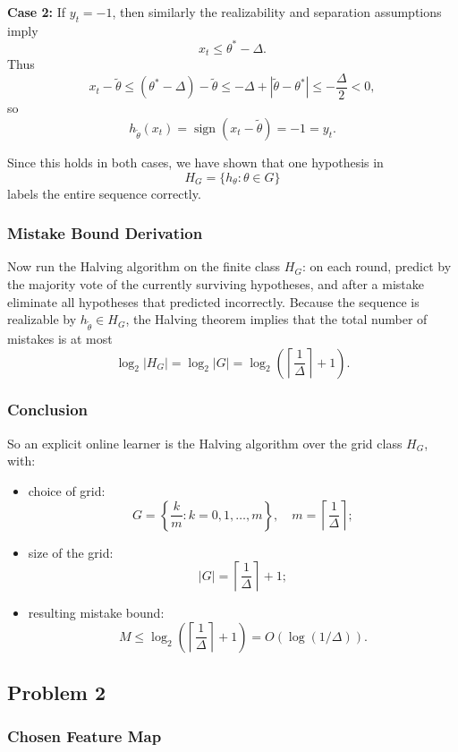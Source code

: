 \documentclass{article}
\begin{document}
\textbf{Case 2: } If $y_t = -1$, then similarly the realizability and separation assumptions imply
$$
x_t \leq \theta^* - \Delta.
$$
Thus
$$
x_t - \widetilde{\theta}
\leq (\theta^* - \Delta) - \widetilde{\theta}
\leq -\Delta + |\widetilde{\theta} - \theta^*|
\leq -\frac{\Delta}{2}
< 0,
$$
so
$$
h_{\widetilde{\theta}}(x_t) = \operatorname{sign}(x_t - \widetilde{\theta}) = -1 = y_t.
$$

Since this holds in both cases, we have shown that one hypothesis in
$$
H_G = \{ h_\theta : \theta \in G \}
$$
labels the entire sequence correctly.

\subsubsection{Mistake Bound Derivation}

Now run the Halving algorithm on the finite class $H_G$: on each round, predict by the majority
vote of the currently surviving hypotheses, and after a mistake eliminate all hypotheses that
predicted incorrectly. Because the sequence is realizable by $h_{\widetilde{\theta}} \in H_G$, the
Halving theorem implies that the total number of mistakes is at most
$$
\log_2 |H_G| = \log_2 |G|
= \log_2 \left( \left\lceil \frac{1}{\Delta} \right\rceil + 1 \right).
$$

\subsubsection{Conclusion}

So an explicit online learner is the Halving algorithm over the grid class $H_G$, with:

\begin{itemize}
\item choice of grid:
$$
G = \left\{ \frac{k}{m} : k = 0,1,\dots,m \right\},
\quad m = \left\lceil \frac{1}{\Delta} \right\rceil;
$$
\item size of the grid:
$$
|G| = \left\lceil \frac{1}{\Delta} \right\rceil + 1;
$$
\item resulting mistake bound:
$$
M \leq \log_2 \left( \left\lceil \frac{1}{\Delta} \right\rceil + 1 \right)
= O(\log(1/\Delta)).
$$
\end{itemize}

\subsection{Problem 2}

\subsubsection{Chosen Feature Map}
\end{document}
